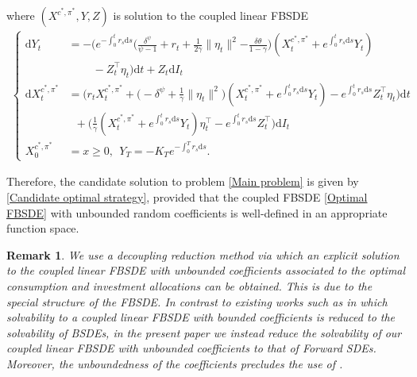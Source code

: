\documentclass[12,reqno]{amsart}
\numberwithin{equation}{section}
\newtheorem{remark}[defi]{Remark}
\begin{document}
where $(X^{c^{*},\pi^{*}},Y,Z)$ is solution to the coupled linear FBSDE
\begin{align}\label{Optimal FBSDE}
	\begin{cases}
		\mathrm{d}Y_{t}&=-\Big(e^{-\int_{0}^{t}r_{s}\mathrm{d}s}\Big(\frac{\delta^{\psi}}{\psi-1}+r_{t}+\frac{1}{2\gamma}\|\eta_{t}\|^{2}{-\frac{\delta\theta}{1-\gamma}}\Big)(X_{t}^{c^{*},\pi^{*}}+e^{\int_{0}^{t}r_{s}\mathrm{d}s}Y_{t})\\
		&\phantom{XXx}-Z_{t}^{\top}\eta_{t}\Big)\mathrm{d}t+Z_{t}\mathrm{d}I_{t}\\
		\mathrm{d}X_{t}^{c^{*},\pi^{*}}&=\Big(r_{t}X_{t}^{c^{*},\pi^{*}}+\big(-\delta^{\psi}+\frac{1}{\gamma}\|\eta_{t}\|^{2}\big)(X_{t}^{c^{*},\pi^{*}}+e^{\int_{0}^{t}r_{s}\mathrm{d}s}Y_{t})-e^{\int_{0}^{t}r_{s}\mathrm{d}s}Z_{t}^{\top}\eta_{t}\Big)\mathrm{d}t\\
		&\phantom{x}+\Big(\frac{1}{\gamma}(X_{t}^{c^{*},\pi^{*}}+e^{\int_{0}^{t}r_{s}\mathrm{d}s}Y_{t})\eta_{t}^{\top}-e^{\int_{0}^{t}r_{s}\mathrm{d}s}Z_{t}^{\top}\Big)\mathrm{d}I_{t}\\
		X_{0}^{c^{*},\pi^{*}}&=x\ge0,~~Y_{T}=-K_{T}e^{-\int_{0}^{T}r_{s}\mathrm{d}s}.
	\end{cases}
\end{align}

Therefore, the candidate solution to problem \eqref{Main problem} is given by \eqref{Candidate optimal strategy}, provided that the coupled FBSDE \eqref{Optimal FBSDE} with unbounded random coefficients is well-defined in an appropriate function space.
\begin{remark}\label{Some remarks on the solvability of FBSDEs}
	We use a decoupling reduction method via which an explicit solution to the coupled linear FBSDE with unbounded coefficients associated to the optimal consumption and investment allocations can be obtained. This is due to the special structure of the FBSDE. In contrast to existing works such as \cite{ma1994solving,yong1999linear,yong2006linear} in which solvability to a coupled linear FBSDE with bounded coefficients is reduced to the solvability of BSDEs, in the present paper we instead reduce the solvability of our coupled linear FBSDE with unbounded coefficients to that of Forward SDEs. Moreover, the unboundedness of the coefficients precludes the use of \cite{ankirchner2022transformation,hu1995solution,ma2015well,pardoux1990adapted,pardoux1999forward,peng1999fully,xie2020exploration}.
\end{remark}
\end{document}
